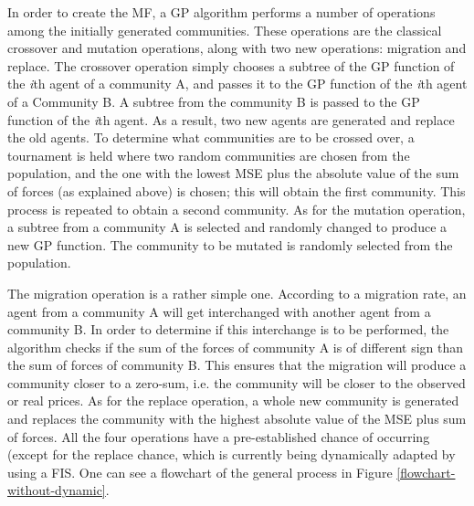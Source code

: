 \documentclass[a4paper,twoside]{article}
\begin{document}

In order to create the MF, a GP algorithm performs a number of
operations among the initially generated communities. These operations
are the classical crossover and mutation operations, along with two
new operations: migration and replace. The crossover operation simply
chooses a subtree of the GP function of the \textit{i}th agent of a
community A, and passes it to the GP function of the \textit{i}th
agent of a Community B. A subtree from the community B is passed to
the GP function of the \textit{i}th agent. As a result, two new agents
are generated and replace the old agents. To determine what
communities are to be crossed over, a tournament is held where two
random communities are chosen from the population, and the one with
the lowest MSE plus the absolute value of the sum of forces (as
explained above)
is chosen; this will obtain the first community. This process is
repeated to obtain a second community. As for the mutation operation,
a subtree from a community A is selected and randomly changed to
produce a new GP function. The community to be mutated is randomly
selected from the population. %

The migration operation is a rather simple one. According to a
migration rate, an agent from a community A will get interchanged
with another agent from a community B. In order to determine if this
interchange is to be performed, the algorithm checks if the sum of the
forces of community A is of different sign than the sum of forces of
community B. This ensures that the migration will produce a community
closer to a zero-sum, i.e. the community will be closer to the
observed or real prices. As for the replace operation, a whole new
community is generated and replaces the community with the highest
absolute value of the MSE plus sum of forces. All the four operations
have a pre-established chance of occurring (except for the replace
chance, which is currently being dynamically adapted by using a FIS.
One can see a flowchart of the general process in Figure
\ref{flowchart-without-dynamic}. %
\end{document}
